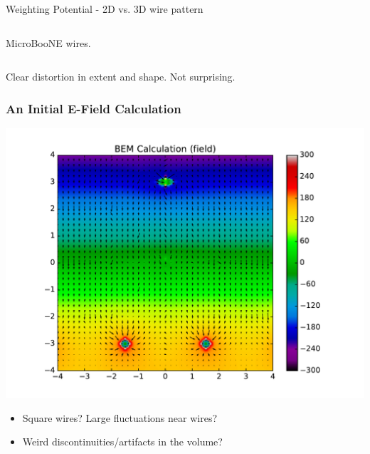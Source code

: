 \documentclass[xcolor=dvipsnames]{beamer}
\newcommand{\microboone}{MicroBooNE\xspace}
\begin{document}
\begin{frame}{Weighting Potential - 2D vs. 3D wire pattern}
\begin{columns}
\begin{column}{0.5\textwidth}
\begin{center}
        \scriptsize \microboone wires.
      \end{center}
    \end{column}
  \end{columns}

  \begin{center}
    Clear distortion in extent and shape.  Not surprising.
  \end{center}

\end{frame}


\begin{frame}
  \frametitle{An Initial E-Field Calculation}
  \begin{center}
    \includegraphics[height=0.7\textheight]{uboone-drift-field-pot-tight.pdf}
  \end{center}
  \vspace{-5mm}
  
  \begin{itemize}\footnotesize
  \item Square wires?  Large fluctuations near wires?
  \item Weird discontinuities/artifacts in the volume?  
  \end{itemize}
\end{frame}
\end{document}
